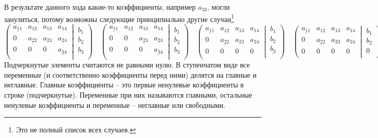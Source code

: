 \documentclass{article}
\begin{document}
В результате данного хода какие-то коэффициенты, например $a_{33}$, могли занулиться, потому возможны следующие принципиально другие случаи\footnote{Это не полный список всех случаев.}
\[
\left(\left.
\begin{matrix}
	\underline{a_{11}}& a_{12}&a_{13}& a_{14}\\
	0& \underline{a_{22}}&a_{23}& a_{24}\\
	0& 0&0& \underline{a_{34}}\\
\end{matrix}
\:\right|\:
\begin{matrix}
	b_1\\
	b_2\\
	b_3\\
\end{matrix}
\right)
\quad
\left(\left.
\begin{matrix}
	\underline{a_{11}}& a_{12}&a_{13}& a_{14}\\
	0& 0&\underline{a_{23}}& a_{24}\\
	0& 0&0& \underline{a_{34}}\\
\end{matrix}
\:\right|\:
\begin{matrix}
	b_1\\
	b_2\\
	b_3\\
\end{matrix}
\right)
\quad
\left(\left.
\begin{matrix}
	\underline{a_{11}}& a_{12}&a_{13}& a_{14}\\
	0& \underline{a_{22}}&a_{23}& a_{24}\\
	0& 0&0& 0\\
\end{matrix}
\:\right|\:
\begin{matrix}
	b_1\\
	b_2\\
	\underline{b_3}\\
\end{matrix}
\right)
\quad
\left(\left.
\begin{matrix}
	\underline{a_{11}}& a_{12}&a_{13}& a_{14}\\
	0& \underline{a_{22}}&a_{23}& a_{24}\\
	0& 0&0& 0\\
\end{matrix}
\:\right|\:
\begin{matrix}
	b_1\\
	b_2\\
	0\\
\end{matrix}
\right)
\]
Подчеркнутые элементы считаются не равными нулю. В ступенчатом виде все переменные (и соответственно коэффициенты перед ними) делятся на главные и неглавные. Главные коэффициенты -- это первые ненулевые коэффициенты в строке (подчеркнутые). Переменные при них называются главными, остальные ненулевые коэффициенты и переменные -- неглавные или свободными.
\end{document}
